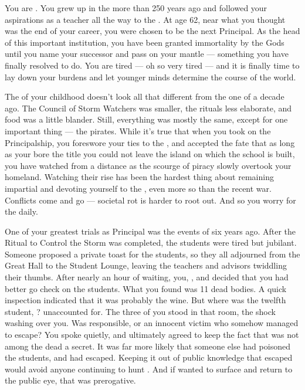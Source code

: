 \documentclass[char]{GL2020}
\begin{document}
\name{\cPrincipal{}}

You are \cPrincipal{\intro}. You grew up in the \pShip{} more than 250 years ago and followed your aspirations as a teacher all the way to the \pSchool{}. At age 62, near what you thought was the end of your career, you were chosen to be the next Principal. As the head of this important institution, you have been granted immortality by the Gods until you name your successor and pass on your mantle — something you have finally resolved to do. You are tired — oh so very tired — and it is finally time to lay down your burdens and let younger minds determine the course of the world.

The \pShip{} of your childhood doesn't look all that different from the one of a decade ago. The Council of Storm Watchers was smaller, the rituals less elaborate, and food was a little blander. Still, everything was mostly the same, except for one important thing — the pirates. While it's true that when you took on the Principalship, you foreswore your ties to the \pShippies{}, and accepted the fate that as long as your bore the title you could not leave the island on which the school is built, you have watched from a distance as the scourge of piracy slowly overtook your homeland. Watching their rise has been the hardest thing about remaining impartial and devoting yourself to the \pSc{}, even more so than the recent war. Conflicts come and go — societal rot is harder to root out. And so you worry for the \pShip{} daily.

One of your greatest trials as Principal was the events of six years ago. After the Ritual to Control the Storm was completed, the students were tired but jubilant. Someone proposed a private toast for the students, so they all adjourned from the Great Hall to the Student Lounge, leaving the teachers and advisors twiddling their thumbs. After nearly an hour of waiting, you, \cDiplomat{\full}, and \cMusic{\full} decided that you had better go check on the students. What you found was 11 dead bodies. A quick inspection indicated that it was probably the wine. But where was the twelfth student, \cKidScientist{\full}? \cKidScientist{\Theywere} unaccounted for. The three of you stood in that room, the shock washing over you. Was \cKidScientist{} responsible, or \cKidScientist{\were} \cKidScientist{\they} an innocent victim who somehow managed to escape? You spoke quietly, and ultimately agreed to keep the fact that \cKidScientist{} was not among the dead a secret. It was far more likely that someone else had poisoned the students, and \cKidScientist{} had escaped. Keeping it out of public knowledge that \cKidScientist{\they} escaped would avoid anyone continuing to hunt \cKidScientist{\them}. And if \cKidScientist{\they} wanted to surface and return to the public eye, that was \cKidScientist{\their} prerogative.
\end{document}
